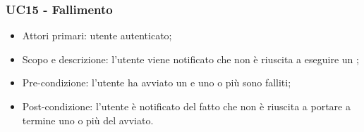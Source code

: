 \subsubsection{UC15 - Fallimento }
\begin{itemize}
	\item  Attori primari: utente autenticato;
	\item  Scopo e descrizione: l'utente viene notificato che   non è riuscita a eseguire un ;
	\item  Pre-condizione: l'utente ha avviato un  e uno o più  sono falliti;
	\item  Post-condizione: l'utente è notificato del fatto che   non è riuscita a portare a termine uno o più  del  avviato.
\end{itemize}